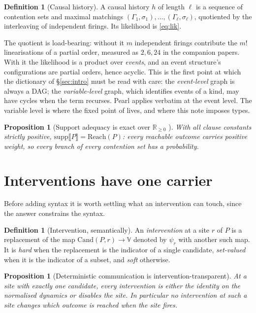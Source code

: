 \documentclass[11pt,a4paper]{article}
\theoremstyle{plain}
\newtheorem{proposition}[theorem]{Proposition}
\theoremstyle{definition}
\newtheorem{definition}[theorem]{Definition}
\theoremstyle{remark}
\newcommand{\sem}[1]{\llbracket #1 \rrbracket}
\newcommand{\V}{\mathbb{V}}
\newcommand{\Rnn}{\mathbb{R}_{\geq 0}}
\newcommand{\Reach}{\mathrm{Reach}}
\newcommand{\supp}{\mathrm{supp}}
\newcommand{\Cand}{\mathrm{Cand}}
\begin{document}
\begin{definition}[Causal history]\label{def:history}
A causal history $h$ of length $\ell$ is a sequence of contention sets and
maximal matchings $(\Gamma_1,\sigma_1),\dots,(\Gamma_\ell,\sigma_\ell)$,
quotiented by the interleaving of independent firings. Its likelihood is
\eqref{eq:lik}.
\end{definition}

The quotient is load-bearing: without it $m$ independent firings contribute the
$m!$ linearisations of a partial order, measured as $2, 6, 24$ in the companion
papers. With it the likelihood is a product over \emph{events}, and an event
structure's configurations are partial orders, hence acyclic. This is the
first point at which the dictionary of \S\ref{sec:intro} must be read with
care: the \emph{event-level} graph is always a DAG; the \emph{variable-level}
graph, which identifies events of a kind, may have cycles when the term
recurses. Pearl applies verbatim at the event level. The variable level is
where the fixed point of \cite{GradedPLN} lives, and where this note imposes
types.

\begin{proposition}[Support adequacy is exact over $\Rnn$ {\cite[Prop.~3.3]{GradedPLN}}]
\label{prop:adequacy}
With all clause constants strictly positive, $\supp\sem{P} = \Reach(P)$: every
reachable outcome carries positive weight, so every branch of every contention
set has a probability.
\end{proposition}

\section{Interventions have one carrier}\label{sec:carrier}

Before adding syntax it is worth settling what an intervention can touch, since
the answer constrains the syntax.

\begin{definition}[Intervention, semantically]\label{def:intervention}
An \emph{intervention} at a site $r$ of $P$ is a replacement of the map
$\Cand(P,r) \to \V$ denoted by $\psi_r$ with another such map. It is
\emph{hard} when the replacement is the indicator of a single candidate,
\emph{set-valued} when it is the indicator of a subset, and \emph{soft}
otherwise.
\end{definition}

\begin{proposition}[Deterministic communication is intervention-transparent]
\label{prop:transparent}
At a site with exactly one candidate, every intervention is either the identity
on the normalised dynamics or disables the site. In particular no intervention
at such a site changes which outcome is reached when the site fires.
\end{proposition}
\end{document}
